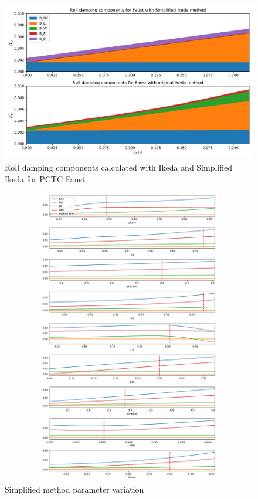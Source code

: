 \begin{figure}[h]
    \centering
    \includegraphics[height=7cm, width=14cm]{figures/ikeda_vs_simplified.pdf}
    \caption{Roll damping components calculated with Ikeda and Simplified Ikeda for PCTC Faust}
    \label{fig:ikeda_vs_simplified}
\end{figure}

\begin{figure}[H]
    \centering
    \includegraphics[height=13cm, width=15cm]{figures/ikeda_variation.pdf}
    \caption{Simplified method parameter variation}
    \label{fig:ikeda_variation}
\end{figure}

